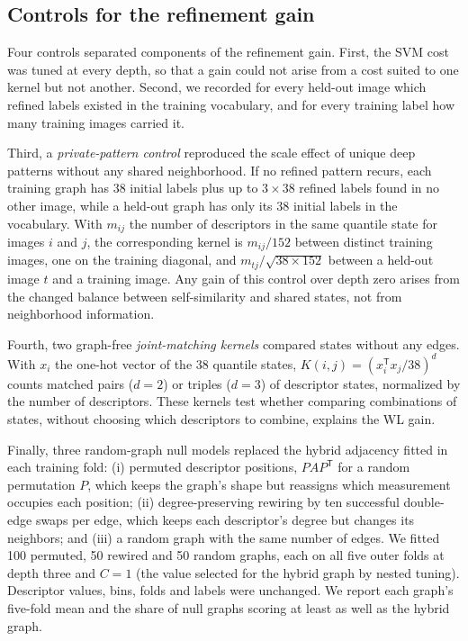 \subsection{Controls for the refinement gain}
\label{sec:controls}
Four controls separated components of the refinement gain. First, the SVM cost was tuned at every depth, so that a gain could not arise from a cost suited to one kernel but not another. Second, we recorded for every held-out image which refined labels existed in the training vocabulary, and for every training label how many training images carried it.

Third, a \emph{private-pattern control} reproduced the scale effect of unique deep patterns without any shared neighborhood. If no refined pattern recurs, each training graph has $38$ initial labels plus up to $3\times38$ refined labels found in no other image, while a held-out graph has only its $38$ initial labels in the vocabulary. With $m_{ij}$ the number of descriptors in the same quantile state for images $i$ and $j$, the corresponding kernel is $m_{ij}/152$ between distinct training images, one on the training diagonal, and $m_{tj}/\sqrt{38\times152}$ between a held-out image $t$ and a training image. Any gain of this control over depth zero arises from the changed balance between self-similarity and shared states, not from neighborhood information.

Fourth, two graph-free \emph{joint-matching kernels} compared states without any edges. With $x_i$ the one-hot vector of the 38 quantile states, $K(i,j)=(x_i^\mathsf{T}x_j/38)^d$ counts matched pairs ($d=2$) or triples ($d=3$) of descriptor states, normalized by the number of descriptors. These kernels test whether comparing combinations of states, without choosing which descriptors to combine, explains the WL gain.

Finally, three random-graph null models replaced the hybrid adjacency fitted in each training fold: (i) permuted descriptor positions, $PAP^\mathsf{T}$ for a random permutation $P$, which keeps the graph's shape but reassigns which measurement occupies each position; (ii) degree-preserving rewiring by ten successful double-edge swaps per edge, which keeps each descriptor's degree but changes its neighbors; and (iii) a random graph with the same number of edges. We fitted 100 permuted, 50 rewired and 50 random graphs, each on all five outer folds at depth three and $C=1$ (the value selected for the hybrid graph by nested tuning). Descriptor values, bins, folds and labels were unchanged. We report each graph's five-fold mean and the share of null graphs scoring at least as well as the hybrid graph.

